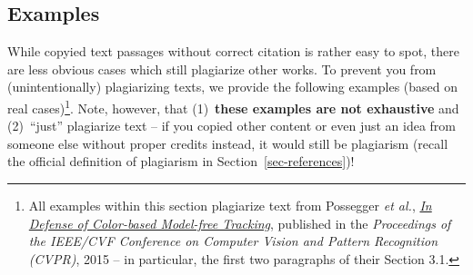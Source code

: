 \documentclass[11pt,a4paper]{article}
\begin{document}
\subsection{Examples}
While copyied text passages without correct citation is rather easy to spot, there are less obvious cases which still plagiarize other works.
To prevent you from (unintentionally) plagiarizing texts, we provide the following examples (based on real cases)\footnote{All examples within this section plagiarize text from Possegger \emph{et al.}, \href{https://ieeexplore.ieee.org/document/7298823}{\emph{In Defense of Color-based Model-free Tracking}}, published in the \emph{Proceedings of the IEEE/CVF Conference on Computer Vision and Pattern Recognition (CVPR)}, 2015 -- in particular, the first two paragraphs of their Section 3.1.}.
% 
Note, however, that (1)~\textbf{these examples are not exhaustive} and (2)~``just'' plagiarize text -- if you copied other content or even just an idea from someone else without proper credits instead, it would still be plagiarism (recall the official definition of plagiarism in Section~\ref{sec-references})!
\end{document}
